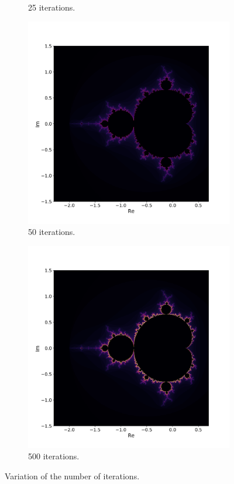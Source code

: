 \documentclass[
  12pt,					%
  a4paper,				%
  twoside,				%
]{report}
\begin{document}
\begin{figure}[H]
\begin{subfigure}{.45\textwidth}
  \caption{25 iterations.}
\end{subfigure}
\begin{subfigure}{.45\textwidth}
  \centering
  \includegraphics[width=\linewidth]{IMG/It50.png}
  \caption{50 iterations.}
\end{subfigure}
\begin{subfigure}{.45\textwidth}
  \centering
  \includegraphics[width=\linewidth]{IMG/It500.png}
  \caption{500 iterations.}
\end{subfigure}
\caption{Variation of the number of iterations.}
\label{FIG_Iteration}
\end{figure}
\end{document}
